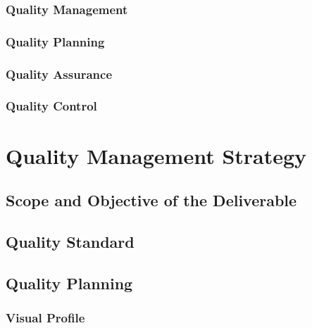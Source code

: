 \documentclass[
  11pt,
]{article}
\begin{document}
\hypertarget{quality-management}{%
\subsubsection{Quality Management}\label{quality-management}}

\hypertarget{quality-planning}{%
\subsubsection{Quality Planning}\label{quality-planning}}

\hypertarget{quality-assurance}{%
\subsubsection{Quality Assurance}\label{quality-assurance}}

\hypertarget{quality-control}{%
\subsubsection{Quality Control}\label{quality-control}}

\clearpage

\hypertarget{quality-management-strategy}{%
\section{Quality Management
Strategy}\label{quality-management-strategy}}

\hypertarget{scope-and-objective-of-the-deliverable}{%
\subsection{Scope and Objective of the
Deliverable}\label{scope-and-objective-of-the-deliverable}}

\hypertarget{quality-standard}{%
\subsection{Quality Standard}\label{quality-standard}}

\hypertarget{quality-planning-1}{%
\subsection{Quality Planning}\label{quality-planning-1}}

\hypertarget{visual-profile}{%
\subsubsection{Visual Profile}\label{visual-profile}}
\end{document}
